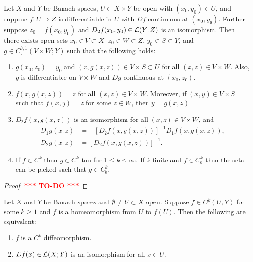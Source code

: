 \documentclass[a4paper]{article}
\newcommand{\TODO}{\textcolor{red}{\textbf{*** TO-DO ***}}}
\begin{document}
\begin{thm}
  Let $X$ and $Y$ be Banach spaces, $U \subset X \times Y$
  be open with $(x_0, y_0) \in U$, and suppose $f: U \to Z$
  is differentiable in $U$ with $Df$ continuous
  at $(x_0, y_0)$. Further suppose $z_0 = f(x_0, y_0)$
  and $D_2 f(x_0, y_0) \in \mathcal{L}(Y; Z)$ is an isomorphism.
  Then there exists open sets $x_0 \in V \subset X$,
  $z_0 \in W \subset Z$, $y_0 \in S \subset Y$, and
  $g \in C^{0,1}_b (V \times W ; Y)$ such that the following
  holds:
  \begin{enumerate}
    \item $g(x_0, z_0) = y_0$ and $(x, g(x, z)) \in V \times S
    \subset U$ for all $(x, z) \in V \times W$. Also, $g$
    is differentiable on $V \times W$ and $Dg$ continuous at
    $(x_0, z_0)$.

    \item $f(x, g(x, z)) = z$ for all $(x, z) \in V \times W$.
    Moreover, if $(x, y) \in V \times S$ such that
    $f(x, y) = z$ for some $z \in W$, then $y = g(x, z)$.

    \item $D_2 f(x, g(x, z))$ is an isomorphism for all
    $(x, z) \in V \times W$, and
    \[
    \begin{aligned}
      D_1 g(x, z) &= - \left[ D_2 f(x, g(x, z)) \right]^{-1}
      D_1 f (x, g(x, z)), \\
      D_2 g(x, z) &= \left[ D_2 f(x, g(x, z)) \right]^{-1}.
    \end{aligned}
    \]

    \item If $f \in C^k$ then $g \in C^k$ too for $1 \leq k
    \leq \infty$. If $k$ finite and $f \in C^k_b$ then the
    sets can be picked such that $g \in C^k_b$.
  \end{enumerate}
\end{thm}

\begin{proof}
  \TODO
\end{proof}


\begin{thm}
Let $X$ and $Y$ be Banach spaces and $\emptyset \neq U \subset X$
open.  Suppose $f \in C^k(U; Y)$ for some $k \geq 1$ and
$f$ is a homeomorphism from $U$ to $f(U)$. Then the following
are equivalent:
\begin{enumerate}
\item $f$ is a $C^k$ diffeomorphism.
\item $Df(x) \in \mathcal{L}(X; Y)$ is an isomorphism for all $x \in U$.
\end{enumerate}
\end{thm}
\end{document}
